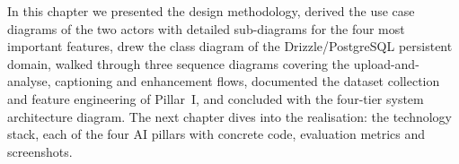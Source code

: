 \chapconclusion
In this chapter we presented the design methodology, derived the use case diagrams of the two
actors with detailed sub-diagrams for the four most important features, drew the class
diagram of the Drizzle/PostgreSQL persistent domain, walked through three sequence diagrams
covering the upload-and-analyse, captioning and enhancement flows, documented the dataset
collection and feature engineering of Pillar~I, and concluded with the four-tier system
architecture diagram. The next chapter dives into the realisation: the technology stack,
each of the four AI pillars with concrete code, evaluation metrics and screenshots.

\cleardoublepage
